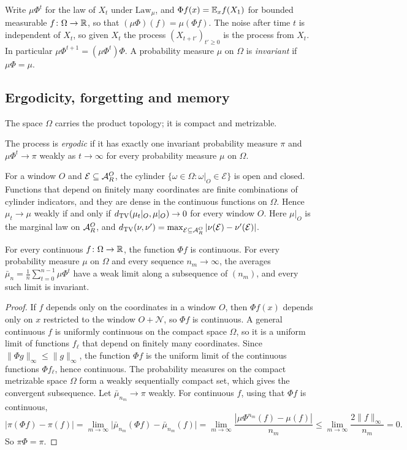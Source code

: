 Write $\mu\Phi^t$ for the law of $X_t$ under $\mathrm{Law}_\mu$, and $\Phi f(x)=\mathbb{E}_x f(X_1)$ for bounded measurable $f\colon\Omega\to\mathbb{R}$, so that $(\mu\Phi)(f)=\mu(\Phi f)$. The noise after time $t$ is independent of $X_t$, so given $X_t$ the process $(X_{t+t'})_{t'\ge0}$ is the process from $X_t$. In particular $\mu\Phi^{t+1}=(\mu\Phi^t)\Phi$. A probability measure $\mu$ on $\Omega$ is \emph{invariant} if $\mu\Phi=\mu$.

\subsection{Ergodicity, forgetting and memory}\label{set:sub-ergodic}

The space $\Omega$ carries the product topology; it is compact and metrizable.

\begin{definition}[Ergodicity]\label{set:def-ergodic}
The process is \emph{ergodic} if it has exactly one invariant probability measure $\pi$ and $\mu\Phi^t\to\pi$ weakly as $t\to\infty$ for every probability measure $\mu$ on $\Omega$.
\end{definition}

For a window $O$ and $\mathcal E\subseteq\mathcal{A}_R^O$, the cylinder $\{\omega\in\Omega:\omega|_O\in\mathcal E\}$ is open and closed. Functions that depend on finitely many coordinates are finite combinations of cylinder indicators, and they are dense in the continuous functions on $\Omega$. Hence $\mu_t\to\mu$ weakly if and only if $d_{\mathrm{TV}}(\mu_t|_O,\mu|_O)\to0$ for every window $O$. Here $\mu|_O$ is the marginal law on $\mathcal{A}_R^O$, and $d_{\mathrm{TV}}(\nu,\nu')=\max_{\mathcal E\subseteq\mathcal{A}_R^O}|\nu(\mathcal E)-\nu'(\mathcal E)|$.

\begin{lemma}\label{set:feller}
For every continuous $f\colon\Omega\to\mathbb{R}$, the function $\Phi f$ is continuous. For every probability measure $\mu$ on $\Omega$ and every sequence $n_m\to\infty$, the averages $\bar\mu_n=\frac1n\sum_{t=0}^{n-1}\mu\Phi^t$ have a weak limit along a subsequence of $(n_m)$, and every such limit is invariant.
\end{lemma}

\begin{proof}
If $f$ depends only on the coordinates in a window $O$, then $\Phi f(x)$ depends only on $x$ restricted to the window $O+\mathcal N$, so $\Phi f$ is continuous. A general continuous $f$ is uniformly continuous on the compact space $\Omega$, so it is a uniform limit of functions $f_\ell$ that depend on finitely many coordinates. Since $\|\Phi g\|_\infty\le\|g\|_\infty$, the function $\Phi f$ is the uniform limit of the continuous functions $\Phi f_\ell$, hence continuous. The probability measures on the compact metrizable space $\Omega$ form a weakly sequentially compact set, which gives the convergent subsequence. Let $\bar\mu_{n_m}\to\pi$ weakly. For continuous $f$, using that $\Phi f$ is continuous,
\[
|\pi(\Phi f)-\pi(f)|=\lim_{m\to\infty}\bigl|\bar\mu_{n_m}(\Phi f)-\bar\mu_{n_m}(f)\bigr|
=\lim_{m\to\infty}\frac{|\mu\Phi^{n_m}(f)-\mu(f)|}{n_m}\le\lim_{m\to\infty}\frac{2\|f\|_\infty}{n_m}=0 .
\]
So $\pi\Phi=\pi$.
\end{proof}

